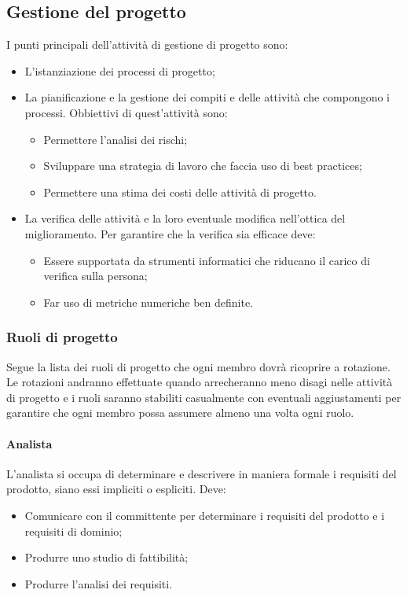 \subsection{Gestione del progetto}
I punti principali dell'attività di gestione di progetto sono:
\begin{itemize} 
\item L'istanziazione dei processi di progetto;
\item La pianificazione e la gestione dei compiti e delle attività che compongono i processi. 
\newline
Obbiettivi di quest'attività sono:
\begin{itemize} 
\item Permettere l'analisi dei rischi;
\item Sviluppare una strategia di lavoro che faccia uso di best practices;
\item Permettere una stima dei costi delle attività di progetto.
\end{itemize}
\item La verifica delle attività e la loro eventuale modifica nell'ottica del miglioramento. 
\newline
Per garantire che la verifica sia efficace deve:
\begin{itemize} 
\item Essere supportata da strumenti informatici che riducano il carico di verifica sulla persona;
\item Far uso di metriche numeriche ben definite.
\end{itemize}
\end{itemize}

\subsubsection{Ruoli di progetto}
Segue la lista dei ruoli di progetto che ogni membro dovrà ricoprire a rotazione.
Le rotazioni andranno effettuate quando arrecheranno meno disagi nelle attività di progetto e i ruoli saranno stabiliti casualmente con eventuali aggiustamenti per garantire che ogni membro possa assumere almeno una volta ogni ruolo.

\paragraph{Analista} \Spazio
L'analista si occupa di determinare e descrivere in maniera formale i requisiti del prodotto, siano essi impliciti o espliciti. Deve:
\begin{itemize} 
\item Comunicare con il committente per determinare i requisiti del prodotto e i requisiti di dominio;
\item Produrre uno studio di fattibilità;
\item Produrre l'analisi dei requisiti.
\end{itemize}

